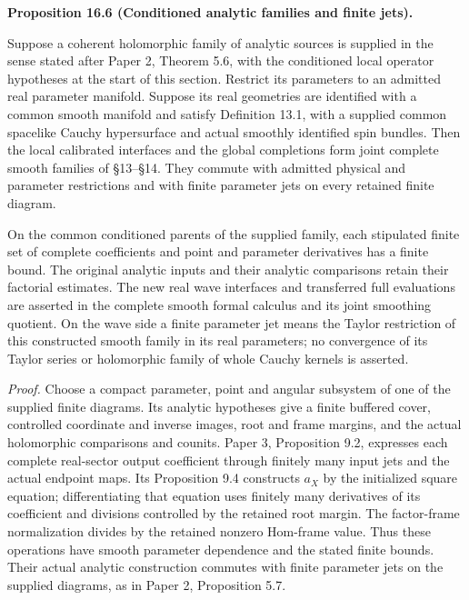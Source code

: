 \documentclass[
  english,
  11pt,
  reqno]{amsart}
\makeatletter
\newcommand{\pandocstatementheading}[1]{%
  \par\if@nobreak\else
    \addpenalty{\@beginparpenalty}%
    \addvspace{.5\baselineskip plus .2\baselineskip minus .2\baselineskip}%
  \fi
  {\normalfont\bfseries #1\par}%
  \nobreak\@afterindenttrue\@afterheading
}
\makeatother
\begin{document}
\pandocstatementheading{\protect{}\label{prop:analytic-wave-conditioned-families}Proposition 16.6 (Conditioned analytic families and finite jets).}

Suppose a coherent holomorphic family of analytic sources is supplied in
the sense stated after Paper 2, Theorem 5.6, with the conditioned local
operator hypotheses at the start of this section. Restrict its
parameters to an admitted real parameter manifold. Suppose its real
geometries are identified with a common smooth manifold and satisfy
Definition 13.1, with a supplied common spacelike Cauchy hypersurface
and actual smoothly identified spin bundles. Then the local calibrated
interfaces and the global completions form joint complete smooth
families of §13--§14. They commute with admitted physical and parameter
restrictions and with finite parameter jets on every retained finite
diagram.

On the common conditioned parents of the supplied family, each
stipulated finite set of complete coefficients and point and parameter
derivatives has a finite bound. The original analytic inputs and their
analytic comparisons retain their factorial estimates. The new real wave
interfaces and transferred full evaluations are asserted in the complete
smooth formal calculus and its joint smoothing quotient. On the wave
side a finite parameter jet means the Taylor restriction of this
constructed smooth family in its real parameters; no convergence of its
Taylor series or holomorphic family of whole Cauchy kernels is asserted.

\emph{Proof.} Choose a compact parameter, point and angular subsystem of
one of the supplied finite diagrams. Its analytic hypotheses give a
finite buffered cover, controlled coordinate and inverse images, root
and frame margins, and the actual holomorphic comparisons and counits.
Paper 3, Proposition 9.2, expresses each complete real-sector output
coefficient through finitely many input jets and the actual endpoint
maps. Its Proposition 9.4 constructs \(a_X\) by the initialized square
equation; differentiating that equation uses finitely many derivatives
of its coefficient and divisions controlled by the retained root margin.
The factor-frame normalization divides by the retained nonzero Hom-frame
value. Thus these operations have smooth parameter dependence and the
stated finite bounds. Their actual analytic construction commutes with
finite parameter jets on the supplied diagrams, as in Paper 2,
Proposition 5.7.
\end{document}
